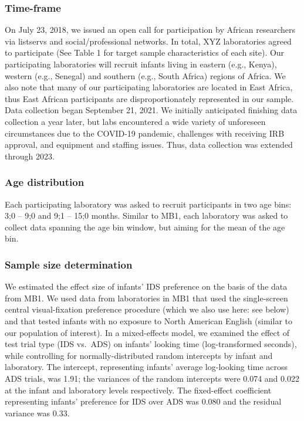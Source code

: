 \documentclass[
  ,man,floatsintext]{apa6}
\begin{document}
\hypertarget{time-frame}{%
\subsubsection{Time-frame}\label{time-frame}}

On July 23, 2018, we issued an open call for participation by African researchers via listservs and social/professional networks. In total, XYZ laboratories agreed to participate (See Table 1 for target sample characteristics of each site). Our participating laboratories will recruit infants living in eastern (e.g., Kenya), western (e.g., Senegal) and southern (e.g., South Africa) regions of Africa. We also note that many of our participating laboratories are located in East Africa, thus East African participants are disproportionately represented in our sample. Data collection began September 21, 2021. We initially anticipated finishing data collection a year later, but labs encountered a wide variety of unforeseen circumstances due to the COVID-19 pandemic, challenges with receiving IRB approval, and equipment and staffing issues. Thus, data collection was extended through 2023.

\hypertarget{age-distribution}{%
\subsubsection{Age distribution}\label{age-distribution}}

Each participating laboratory was asked to recruit participants in two age bins: 3;0 -- 9;0 and 9;1 -- 15;0 months. Similar to MB1, each laboratory was asked to collect data spanning the age bin window, but aiming for the mean of the age bin.

\hypertarget{sample-size-determination}{%
\subsubsection{Sample size determination}\label{sample-size-determination}}

We estimated the effect size of infants' IDS preference on the basis of the data from MB1. We used data from laboratories in MB1 that used the single-screen central visual-fixation preference procedure (which we also use here: see below) and that tested infants with no exposure to North American English (similar to our population of interest). In a mixed-effects model, we examined the effect of test trial type (IDS vs.~ADS) on infants' looking time (log-transformed seconds), while controlling for normally-distributed random intercepts by infant and laboratory. The intercept, representing infants' average log-looking time across ADS trials, was 1.91; the variances of the random intercepts were 0.074 and 0.022 at the infant and laboratory levels respectively. The fixed-effect coefficient representing infants' preference for IDS over ADS was 0.080 and the residual variance was 0.33.
\end{document}
